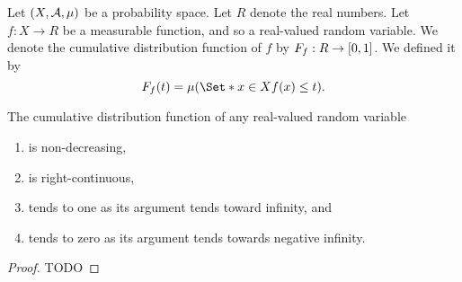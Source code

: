 
Let $(X, \mathcal{A}, \mu)$
be a probability space.
Let $R$ denote the real
numbers.
Let $f: X \to R$ be
a measurable function,
and so a real-valued random
variable.
We denote the cumulative
distribution function
of $f$ by $F_{f}: R \to [0, 1]$.
We defined it by
\[
  \rvcdf{f}(t) = \mu(\Set*{x \in X}{f(x) \leq t}).
\]


\begin{prop}
The cumulative distribution function
of any real-valued random variable
\begin{enumerate}

  \item
    is non-decreasing,

  \item
    is right-continuous,

  \item
    tends to one as its argument
    tends toward infinity, and

  \item
    tends to zero as its argument
    tends towards negative infinity.
\end{enumerate}
  \begin{proof}
    TODO
  \end{proof}
\end{prop}
\strats
